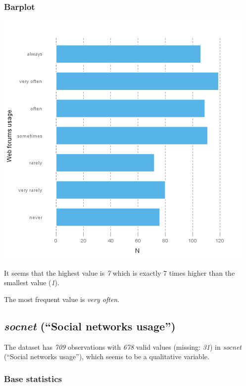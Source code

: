 \documentclass[]{article}
\makeatletter
\def\maxwidth{\ifdim\Gin@nat@width>\linewidth\linewidth
\else\Gin@nat@width\fi}
\let\Oldincludegraphics\includegraphics
\renewcommand{\includegraphics}[1]{\Oldincludegraphics[width=\maxwidth]{#1}}
\makeatother
\begin{document}
\subsubsection{Barplot}

\href{e866a67bba62e7f5cbe93b184599019f-hires.png}{\includegraphics{e866a67bba62e7f5cbe93b184599019f.png}}

It seems that the highest value is \emph{7} which is exactly 7 times
higher than the smallest value (\emph{1}).

The most frequent value is \emph{very often}.

\subsection{\emph{socnet} (``Social networks usage'')}

The dataset has \emph{709} observations with \emph{678} valid values
(missing: \emph{31}) in \emph{socnet} (``Social networks usage''), which
seems to be a qualitative variable.

\subsubsection{Base statistics}
\end{document}
